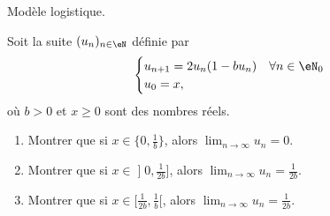 
\begin{exercice}\label{exoTD3-0012}

	Modèle logistique.

	Soit la suite $(u_n)_{n\in\eN}$ définie par
	\begin{equation}
		\begin{cases}
			u_{n+1}=2u_n(1-bu_n)	&	\forall n\in\eN_0\\
			u_0=x,
		\end{cases}
	\end{equation}
	où $b>0$ et $x\geq 0$ sont des nombres réels.
	\begin{enumerate}
		\item
			Montrer que si $x\in\{ 0,\frac{1}{ b } \}$, alors $\lim_{n\to\infty}u_n=0$.
		\item
			Montrer que si $x\in\mathopen] 0 , \frac{1}{ 2b } \mathclose]$, alors $\lim_{n\to\infty}u_n=\frac{1}{ 2b }$.
		\item
			Montrer que si $x\in\mathopen[ \frac{1}{ 2b } , \frac{1}{ b } [$, alors $\lim_{n\to\infty}u_n=\frac{1}{ 2b }$.
	\end{enumerate}

\end{exercice}
